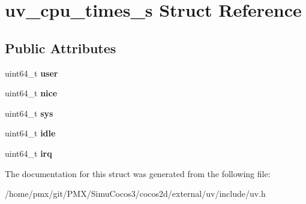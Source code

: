 \hypertarget{structuv__cpu__times__s}{}\section{uv\+\_\+cpu\+\_\+times\+\_\+s Struct Reference}
\label{structuv__cpu__times__s}
\subsection*{Public Attributes}
\begin{DoxyCompactItemize}
\item 
\mbox{\label{structuv__cpu__times__s_a7f7b938d6e2866734520e5ee7782647d}} 
uint64\+\_\+t {\bfseries user}
\item 
\mbox{\label{structuv__cpu__times__s_a02af541fee7dbe4dbdfce166c483be4d}} 
uint64\+\_\+t {\bfseries nice}
\item 
\mbox{\label{structuv__cpu__times__s_a409e2331c9c5746c3ffe856392d154c7}} 
uint64\+\_\+t {\bfseries sys}
\item 
\mbox{\label{structuv__cpu__times__s_a7e6e53078e1acb42c24ad12a1995b6c1}} 
uint64\+\_\+t {\bfseries idle}
\item 
\mbox{\label{structuv__cpu__times__s_ab5ae02e43cc3bb25ea871a791f74486b}} 
uint64\+\_\+t {\bfseries irq}
\end{DoxyCompactItemize}


The documentation for this struct was generated from the following file\+:\begin{DoxyCompactItemize}
\item 
/home/pmx/git/\+P\+M\+X/\+Simu\+Cocos3/cocos2d/external/uv/include/uv.\+h\end{DoxyCompactItemize}
